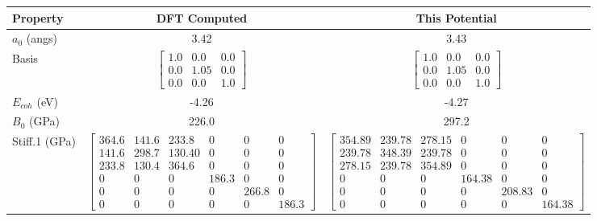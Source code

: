 \begin{table}[ht]
\renewcommand{\arraystretch}{1.2}
\begin{tabular}{lcccccc}
\hline\hline
Property & \multicolumn{3}{c}{DFT Computed} & \multicolumn{3}{c}{This Potential} \\
\hline\hline
$a_0$ (angs)         & \multicolumn{3}{c}{3.42}   & \multicolumn{3}{c}{3.43} \\
Basis            & \multicolumn{3}{c}{$\begin{bmatrix} 1.0 & 0.0 & 0.0 \\ 0.0 & 1.05 & 0.0 \\ 0.0 & 0.0 & 1.0  \end{bmatrix}$} & \multicolumn{3}{c}{$\begin{bmatrix} 1.0 & 0.0 & 0.0 \\ 0.0 & 1.05 & 0.0 \\ 0.0 & 0.0 & 1.0  \end{bmatrix}$} \\
$E_{coh}$ (eV)           & \multicolumn{3}{c}{-4.26}  & \multicolumn{3}{c}{-4.27} \\
$B_0$ (GPa)              & \multicolumn{3}{c}{226.0}  & \multicolumn{3}{c}{297.2} \\
Stiff.1 (GPa) & \multicolumn{3}{c}{$\begin{bmatrix} 364.6 & 141.6 & 233.8 & 0 & 0 & 0 \\ 141.6 & 298.7 & 130.40 & 0 & 0 & 0 \\ 233.8 & 130.4 & 364.6 & 0 & 0 & 0 \\ 0 & 0 & 0 & 186.3 & 0 & 0 \\ 0 & 0 & 0 & 0 & 266.8 & 0 \\ 0 & 0 & 0 & 0 & 0 & 186.3 \end{bmatrix}$}   & \multicolumn{3}{c}{$\begin{bmatrix} 354.89 &  239.78 & 278.15 & 0 & 0 & 0 \\ 239.78 & 348.39 & 239.78 & 0 & 0 & 0 \\ 278.15 & 239.78 & 354.89 & 0 & 0 & 0 \\ 0 & 0 & 0 & 164.38 & 0 & 0 \\ 0 & 0 & 0 & 0 & 208.83 & 0 \\ 0 & 0 & 0 & 0 & 0 & 164.38 \end{bmatrix}$} \\

\end{tabular}
\end{table}
